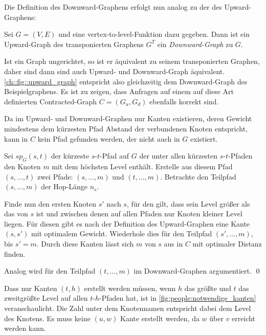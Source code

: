 Die Definition des Downward-Graphens erfolgt nun analog zu der des Upward-Graphens:

\begin{definition}
  Sei $G = (V, E)$ und eine vertex-to-level-Funktion dazu gegeben. Dann ist ein Upward-Graph des transponierten Graphens $G^T$ ein \emph{Downward-Graph} zu $G$.
\end{definition}

Ist ein Graph ungerichtet, so ist er äquivalent zu seinem transponierten Graphen, daher sind dann sind auch Upward- und Downward-Graph äquivalent.
\autoref{ch::fig::upward_graph} entspricht also gleichzeitig dem Downward-Graph des Beispielgraphens.
Es ist zu zeigen, dass Anfragen auf einem auf diese Art definierten Contracted-Graph $C = (G_u, G_d)$ ebenfalls korrekt sind.

\begin{beweis}
  Da im Upward- und Downward-Graphen nur Kanten existieren, deren Gewicht mindestens dem kürzesten Pfad Abstand der verbundenen Knoten entspricht, kann in $C$ kein Pfad gefunden werden, der nicht auch in $G$ existiert.

  Sei ${sp}_G(s, t)$ der kürzeste $s$-$t$-Pfad auf $G$ der unter allen kürzesten $s$-$t$-Pfaden den Knoten $m$ mit dem höchsten Level enthält.
  Erstelle aus diesem Pfad $(s, \dotsc, t)$ zwei Pfade: $(s, \dotsc, m)$ und $(t, \dotsc, m)$.
  Betrachte den Teilpfad $(s, \dotsc, m)$ der Hop-Länge $n_s$.

  Finde nun den ersten Knoten $s'$ nach $s$, für den gilt, dass sein Level größer als das von $s$ ist und zwischen denen auf allen Pfaden nur Knoten kleiner Level liegen.
  Für diesen gibt es nach der Definition des Upward-Graphen eine Kante $(s, s')$ mit optimalem Gewicht.
  Wiederhole dies für den Teilpfad $(s', \dotsc, m)$, bis $s' = m$.
  Durch diese Kanten lässt sich $m$ von $s$ aus in $C$ mit optimaler Distanz finden.

  Analog wird für den Teilpfad $(t, \dotsc, m)$ im Downward-Graphen argumentiert.
  \qed
\end{beweis}

Dass nur Kanten $(t, h)$ erstellt werden müssen, wenn $h$ das größte und $t$ das zweitgrößte Level auf allen $t$-$h$-Pfaden hat, ist in \autoref{fig:people:notwendige_kanten} veranschaulicht.
Die Zahl unter dem Knotennamen entspricht dabei dem Level des Knotens.
Es muss keine $(u, w)$ Kante erstellt werden, da $w$ über $v$ erreicht werden kann.

